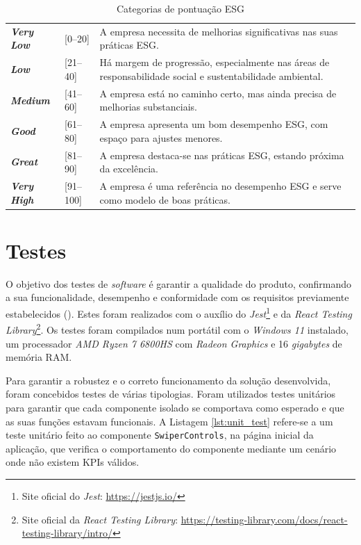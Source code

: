 \begin{table}[H]
    \renewcommand{\arraystretch}{1.3}
    \setlength{\tabcolsep}{10pt}
    \centering
    \begin{tabular}{>{\bfseries}p{2.5cm} p{3cm} p{9cm}}
        \rowcolor{red!30} 
        \textit{Very Low} & [0--20] & A empresa necessita de melhorias significativas nas suas práticas ESG. \\
        \rowcolor{orange!40} 
        \textit{Low} & [21--40] & Há margem de progressão, especialmente nas áreas de responsabilidade social e sustentabilidade ambiental. \\
        \rowcolor{yellow!40} 
        \textit{Medium} & [41--60] & A empresa está no caminho certo, mas ainda precisa de melhorias substanciais. \\
        \rowcolor{green!30} 
        \textit{Good} & [61--80] & A empresa apresenta um bom desempenho ESG, com espaço para ajustes menores. \\
        \rowcolor{green!45!blue!25} 
        \textit{Great} & [81--90] & A empresa destaca-se nas práticas ESG, estando próxima da excelência. \\
        \rowcolor{teal!40} 
        \textit{Very High} & [91--100] & A empresa é uma referência no desempenho ESG e serve como modelo de boas práticas. \\
    \end{tabular}
    \caption{Categorias de pontuação ESG}
    \label{tab:esg_categories}
\end{table}


\section{Testes}

O objetivo dos testes de \textit{software} é garantir a qualidade do produto, confirmando a sua funcionalidade, desempenho e conformidade com os requisitos previamente estabelecidos (\cite{softdesing2025}). Estes foram realizados com o auxílio do \textit{Jest}\footnote{Site oficial do \textit{Jest}: \url{https://jestjs.io/}} e da \textit{React Testing Library}\footnote{Site oficial da \textit{React Testing Library}: \url{https://testing-library.com/docs/react-testing-library/intro/}}. Os testes foram compilados num portátil com o \textit{Windows 11} instalado, um processador \textit{AMD Ryzen 7 6800HS} com \textit{Radeon Graphics} e 16 \textit{gigabytes} de memória RAM.

Para garantir a robustez e o correto funcionamento da solução desenvolvida, foram concebidos testes de várias tipologias. Foram utilizados testes unitários para garantir que cada componente isolado se comportava como esperado e que as suas funções estavam funcionais. A Listagem \ref{lst:unit_test} refere-se a um teste unitário feito ao componente \texttt{SwiperControls}, na página inicial da aplicação, que verifica o comportamento do componente mediante um cenário onde não existem KPIs válidos.

